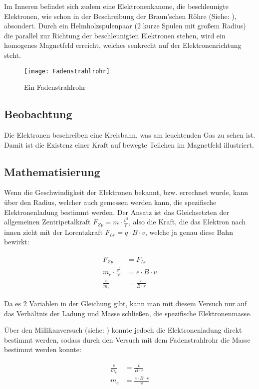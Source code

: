 Im Inneren befindet sich zudem eine Elektronenkanone, die beschleunigte Elektronen, wie schon in der Beschreibung der Braun'schen Röhre (Siehe: ), absondert. Durch ein Helmholzspulenpaar (2 kurze Spulen mit großem Radius) die parallel zur Richtung der beschleunigten Elektronen stehen, wird ein homogenes Magnetfeld erreicht, welches senkrecht auf der Elektronenrichtung steht.

\begin{figure}[h!]
	\centering
	\texttt{[image: Fadenstrahlrohr]}
	\caption{Ein Fadenstrahlrohr}
	\label{fig:Fadenstrahlrohr}
\end{figure}

\subsection{Beobachtung}

Die Elektronen beschreiben eine Kreisbahn, was am leuchtenden Gas zu sehen ist. Damit ist die Existenz einer Kraft auf bewegte Teilchen im Magnetfeld illustriert.

\subsection{Mathematisierung}

Wenn die Geschwindigkeit der Elektronen bekannt, bzw. errechnet wurde, kann über den Radius, welcher auch gemessen werden kann, die spezifische Elektronenladung bestimmt werden. Der Ansatz ist das Gleichsetzten der allgemeinen Zentripetalkraft $F_{Zp} = m \cdot \frac{v^2}{r}$, also die Kraft, die das Elektron nach innen zieht mit der Lorentzkraft  $F_{Lr} = q \cdot B \cdot v$, welche ja genau diese Bahn bewirkt:

\begin{align}
\begin{split}
	F_{Zp} &= F_{Lr} \\
	m_e \cdot \frac{v^2}{r} &= e \cdot B \cdot v \\
	\frac{e}{m_e} &=\frac{v}{B \cdot r}
\end{split}
\end{align}

\noindent Da es 2 Variablen in der Gleichung gibt, kann man mit diesem Versuch nur auf das Verhältnis der Ladung und Masse schließen, die \glqq spezifische Elektronenmasse\grqq .

Über den Millikanversuch (siehe: ) konnte jedoch die Elektronenladung direkt bestimmt werden, sodass durch den Versuch mit dem Fadenstrahlrohr die Masse bestimmt werden konnte:

\begin{align}
\begin{split}
	\frac{e}{m_e} &=\frac{v}{B \cdot r} \\
	m_e &=\frac{e \cdot B \cdot r}{v}
\end{split}
\end{align}





